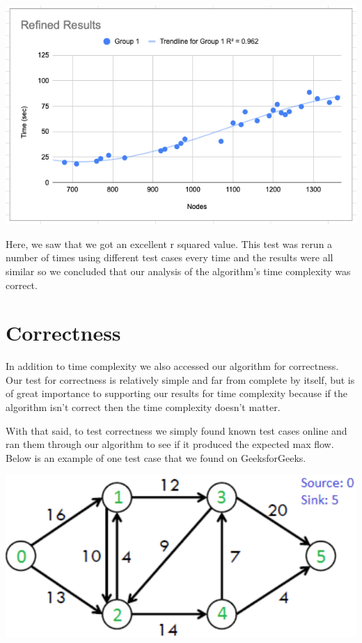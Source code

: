 \documentclass{report}
\begin{document}
\includegraphics[width=\textwidth]{assets/Josh2.png}

Here, we saw that we got an excellent r squared value. This test was rerun a number of times using different test cases every time and the results were all similar so we concluded that our analysis of the algorithm's time complexity was correct.

\section{Correctness}
In addition to time complexity we also accessed our algorithm for correctness. Our test for correctness is relatively simple and far from complete by itself, but is of great importance to supporting our results for time complexity because if the algorithm isn't correct then the time complexity doesn’t matter.

With that said, to test correctness we simply found known test cases online and ran them through our algorithm to see if it produced the expected max flow. Below is an example of one test case that we found on GeeksforGeeks.

\includegraphics[width=\textwidth]{assets/Josh3.png}
\end{document}
